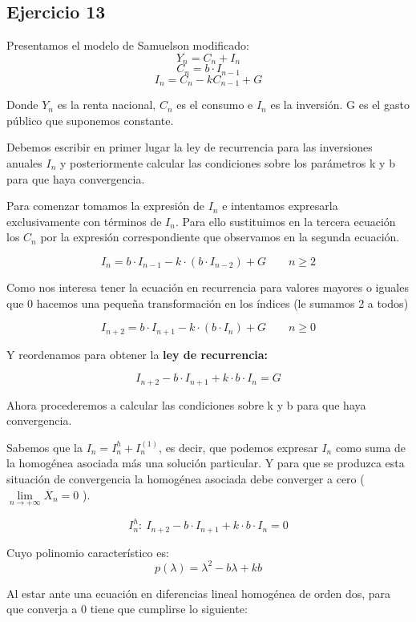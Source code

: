 \documentclass[11pt, a4paper]{article}
\newif\IfInSansMode
\theoremstyle{theorem-style}
\theoremstyle{definition-style}
\theoremstyle{remark-style}
\theoremstyle{example-style}
\begin{document}
    \subsection{Ejercicio 13}

    Presentamos el modelo de Samuelson modificado:
    $$Y_n = C_n + I_n$$
    $$C_n=b\cdot I_{n-1}$$
    $$I_n = C_n-kC_{n-1}+G$$

    Donde $Y_n$ es la renta nacional, $C_n$ es el consumo e $I_n$ es la inversión. G es el gasto público que suponemos constante.

    Debemos escribir en primer lugar la ley de recurrencia para las inversiones anuales $I_n$ y posteriormente calcular las condiciones sobre los parámetros k y b para que haya convergencia.

    Para comenzar tomamos la expresión de $I_n$ e intentamos expresarla exclusivamente con términos de $I_n$. Para ello sustituimos en la tercera ecuación los $C_n$ por la expresión correspondiente que observamos en la segunda ecuación.

    $$I_n = b\cdot I_{n-1}-k\cdot (b\cdot I_{n-2}) +G\quad \quad n \ge 2$$

    Como nos interesa tener la ecuación en recurrencia para valores mayores o iguales que 0 hacemos una pequeña transformación en los índices (le sumamos 2 a todos)

    $$I_{n+2} = b\cdot I_{n+1}-k\cdot (b\cdot I_{n}) +G\quad \quad n \ge 0$$

    Y reordenamos para obtener la \textbf{ley de recurrencia:}

    $$I_{n+2} - b\cdot I_{n+1} + k\cdot b\cdot I_{n} = G$$

    \newpage
    Ahora procederemos a calcular las condiciones sobre k y b para que haya convergencia.

    Sabemos que la $I_n = I_n^h+I_n^{(1)}$, es decir, que podemos expresar $I_n$ como suma de la homogénea asociada más una solución particular. Y para que se produzca esta situación de convergencia la homogénea asociada debe converger a cero ( $\lim \limits_{n \to +\infty} X_n = 0 $ ).

    $$I_n^h:\ I_{n+2} - b\cdot I_{n+1} + k\cdot b\cdot I_{n} = 0 $$

    Cuyo polinomio característico es:
    $$p(\lambda) = \lambda^2 - b\lambda + kb$$

    Al estar ante una ecuación en diferencias lineal homogénea de orden dos, para que converja a 0 tiene que cumplirse lo siguiente:
\end{document}
